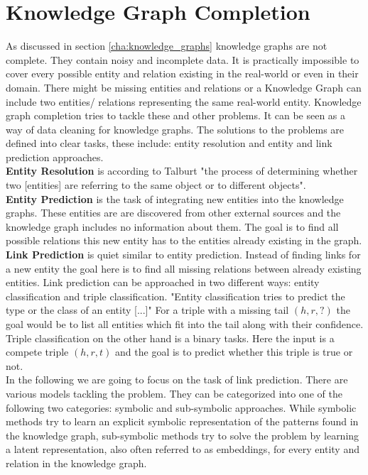 \chapter{Knowledge Graph Completion}
\label{cha:knowledge_graph_completion}

As discussed in section \ref{cha:knowledge_graphs} knowledge graphs are not complete. They contain noisy  and incomplete data. It is practically impossible to cover every possible entity and relation existing in the real-world or even in their domain. There might be missing entities and relations or a Knowledge Graph can include two entities/ relations representing the same real-world entity. Knowledge graph completion tries to tackle these and other problems. It can be seen as a way of data cleaning for knowledge graphs. The solutions to the problems are defined into clear tasks, these include: entity resolution and entity and link prediction approaches. \\

\textbf{Entity Resolution} is according to Talburt "the process of determining whether two [entities] are referring to the same object or to different objects". \cite{talburt_entity_2011} \\ 

\textbf{Entity Prediction} is the task of integrating new entities into the knowledge graphs. These entities are are discovered from other external sources and the knowledge graph includes no information about them. The goal is to find all possible relations this new entity has to the entities already existing in the graph. \cite[p.~1]{baumgartner_entity_2021} \\

\textbf{Link Prediction} is quiet similar to entity prediction. Instead of finding links for a new entity the goal here is to find all missing relations between already existing entities. \cite[p.~125]{golbeck_analyzing_2013} Link prediction can be approached in two different ways: entity classification and triple classification. "Entity classification tries to predict the type or the class of an entity [...]" \cite{ilkou_symbolic_2020} For a triple with a missing tail $(h,r,?)$ the goal would be to list all entities which fit into the tail along with their confidence. Triple classification on the other hand is a binary tasks. Here the input is a compete triple $(h,r,t)$ and the goal is to predict whether this triple is true or not. \cite{ilkou_symbolic_2020} \\

In the following we are going to focus on the task of link prediction. There are various models tackling the problem. They can be categorized into one of the following two categories: symbolic and sub-symbolic approaches. While symbolic methods try to learn an explicit symbolic representation of the patterns found in the knowledge graph, sub-symbolic methods try to solve the problem by learning a latent representation, also often referred to as embeddings, for every entity and relation in the knowledge graph. \cite{meilicke_reinforced_2020} 

